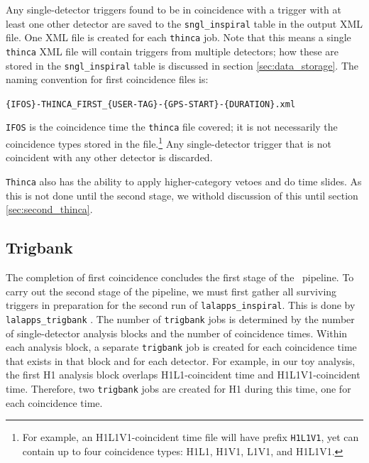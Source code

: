 Any single-detector triggers found to be in coincidence with a trigger with at
least one other detector are saved to the \texttt{sngl\_inspiral} table in the
output XML file.  One XML file is created for each \texttt{thinca} job. Note
that this means a single \texttt{thinca} XML file will contain triggers from
multiple detectors; how these are stored in the \texttt{sngl\_inspiral} table
is discussed in section \ref{sec:data_storage}. The naming convention for first
coincidence files is:
\begin{center}
\texttt{\{IFOS\}-THINCA\_FIRST\_\{USER-TAG\}-\{GPS-START\}-\{DURATION\}.xml}
\end{center}
\texttt{IFOS} is the coincidence time the \texttt{thinca} file
covered; it is not necessarily the coincidence types stored in the
file.\footnote{For example, an H1L1V1-coincident time file will have prefix
\texttt{H1L1V1}, yet can contain up to four coincidence types: H1L1, H1V1,
L1V1, and H1L1V1.} Any single-detector trigger that is not coincident with any
other detector is discarded.

\texttt{Thinca} also has the ability to apply higher-category vetoes and do
time slides. As this is not done until the second stage, we withold discussion
of this until section \ref{sec:second_thinca}.

\subsection{Trigbank}
\label{sec:tribank}

The completion of first coincidence concludes the first stage of the
\hipe~pipeline. To carry out the second stage of the pipeline, we must first
gather all surviving triggers in preparation for the second run of
\texttt{lalapps\_inspiral}. This is done by \texttt{lalapps\_trigbank}
\cite{brown-2005-22}. The number of \texttt{trigbank} jobs is determined by the
number of single-detector analysis blocks and the number of coincidence times.
Within each analysis block, a separate \texttt{trigbank} job is created for
each coincidence time that exists in that block and for each detector. For
example, in our toy analysis, the first H1 analysis block overlaps
H1L1-coincident time and H1L1V1-coincident time. Therefore, two
\texttt{trigbank} jobs are created for H1 during this time, one for each
coincidence time.

